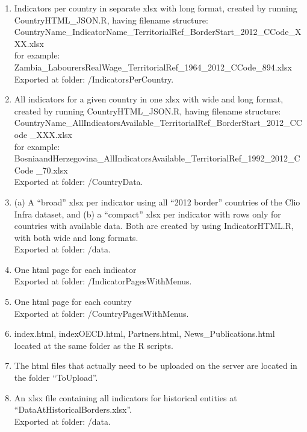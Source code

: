 \documentclass[a4paper]{article}
\begin{document}
\begin{enumerate}
 \item Indicators per country in separate xlsx with long format, created by 
running CountryHTML\_JSON.R, having filename structure:\\
CountryName\_IndicatorName\_TerritorialRef\_BorderStart\_2012\_CCode\_XXX.xlsx\\
for example: 
Zambia\_LabourersRealWage\_TerritorialRef\_1964\_2012\_CCode\_894.xlsx\\
Exported at folder: /IndicatorsPerCountry.

 \item All indicators for a given country in one xlsx with wide and long 
format, created by running CountryHTML\_JSON.R, having filename structure:\\
CountryName\_AllIndicatorsAvailable\_TerritorialRef\_BorderStart\_2012\_CCode
\_XXX.xlsx\\ for example:
BosniaandHerzegovina\_AllIndicatorsAvailable\_TerritorialRef\_1992\_2012\_CCode
\_70.xlsx \\
Exported at folder: /CountryData.

 \item (a) A ``broad'' xlsx per indicator using all ``2012 border'' countries 
of the Clio Infra dataset, and (b) a ``compact'' xlsx per indicator with rows 
only for countries with available data. Both are created by using 
IndicatorHTML.R, with both wide and long formats.\\
Exported at folder: /data.

 \item One html page for each indicator\\
Exported at folder: /IndicatorPagesWithMenus.

 \item One html page for each country\\
Exported at folder: /CountryPagesWithMenus.

 \item index.html, indexOECD.html, Partners.html, News\_Publications.html 
located at the same folder as the R scripts.
  
 \item The html files that actually need to be uploaded on the server are 
located in the folder ``ToUpload''.

\item An xlsx file containing all indicators for historical entities at 
``DataAtHistoricalBorders.xlsx''.\\
Exported at folder: /data.
 
\end{enumerate}
\end{document}
